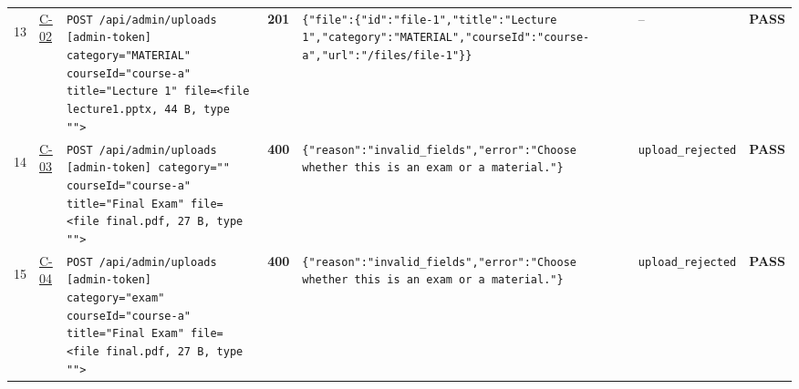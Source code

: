 \documentclass[10pt,a4paper]{article}
\begin{document}
\begin{landscape}
\begin{longtable}{@{}P{0.6cm}P{0.9cm}P{8.5cm}P{1.0cm}P{6.2cm}P{4.2cm}P{1.1cm}@{}}
\hypertarget{call13}{13} & \hyperlink{test-C-02}{C-02} & \texttt{POST /\allowbreak{}api/\allowbreak{}admin/\allowbreak{}uploads [admin-\allowbreak{}token] category=\allowbreak{}"\allowbreak{}MATERIAL"\allowbreak{} courseId=\allowbreak{}"\allowbreak{}course-\allowbreak{}a"\allowbreak{} title=\allowbreak{}"\allowbreak{}Lecture 1"\allowbreak{} file=\allowbreak{}<file lecture1.\allowbreak{}pptx,\allowbreak{} 44 B,\allowbreak{} type "\allowbreak{}"\allowbreak{}>} & \textcolor{passgreen}{\textbf{201}} & \texttt{\{"\allowbreak{}file"\allowbreak{}:\allowbreak{}\{"\allowbreak{}id"\allowbreak{}:\allowbreak{}"\allowbreak{}file-\allowbreak{}1"\allowbreak{},\allowbreak{}"\allowbreak{}title"\allowbreak{}:\allowbreak{}"\allowbreak{}Lecture 1"\allowbreak{},\allowbreak{}"\allowbreak{}category"\allowbreak{}:\allowbreak{}"\allowbreak{}MATERIAL"\allowbreak{},\allowbreak{}"\allowbreak{}courseId"\allowbreak{}:\allowbreak{}"\allowbreak{}course-\allowbreak{}a"\allowbreak{},\allowbreak{}"\allowbreak{}url"\allowbreak{}:\allowbreak{}"\allowbreak{}/\allowbreak{}files/\allowbreak{}file-\allowbreak{}1"\allowbreak{}\}\}} & -- & \textcolor{passgreen}{\textbf{PASS}} \\
\hypertarget{call14}{14} & \hyperlink{test-C-03}{C-03} & \texttt{POST /\allowbreak{}api/\allowbreak{}admin/\allowbreak{}uploads [admin-\allowbreak{}token] category=\allowbreak{}"\allowbreak{}"\allowbreak{} courseId=\allowbreak{}"\allowbreak{}course-\allowbreak{}a"\allowbreak{} title=\allowbreak{}"\allowbreak{}Final Exam"\allowbreak{} file=\allowbreak{}<file final.\allowbreak{}pdf,\allowbreak{} 27 B,\allowbreak{} type "\allowbreak{}"\allowbreak{}>} & \textcolor{warnamber}{\textbf{400}} & \texttt{\{"\allowbreak{}reason"\allowbreak{}:\allowbreak{}"\allowbreak{}invalid\_\allowbreak{}fields"\allowbreak{},\allowbreak{}"\allowbreak{}error"\allowbreak{}:\allowbreak{}"\allowbreak{}Choose whether this is an exam or a material.\allowbreak{}"\allowbreak{}\}} & \texttt{upload\_\allowbreak{}rejected} & \textcolor{passgreen}{\textbf{PASS}} \\
\hypertarget{call15}{15} & \hyperlink{test-C-04}{C-04} & \texttt{POST /\allowbreak{}api/\allowbreak{}admin/\allowbreak{}uploads [admin-\allowbreak{}token] category=\allowbreak{}"\allowbreak{}exam"\allowbreak{} courseId=\allowbreak{}"\allowbreak{}course-\allowbreak{}a"\allowbreak{} title=\allowbreak{}"\allowbreak{}Final Exam"\allowbreak{} file=\allowbreak{}<file final.\allowbreak{}pdf,\allowbreak{} 27 B,\allowbreak{} type "\allowbreak{}"\allowbreak{}>} & \textcolor{warnamber}{\textbf{400}} & \texttt{\{"\allowbreak{}reason"\allowbreak{}:\allowbreak{}"\allowbreak{}invalid\_\allowbreak{}fields"\allowbreak{},\allowbreak{}"\allowbreak{}error"\allowbreak{}:\allowbreak{}"\allowbreak{}Choose whether this is an exam or a material.\allowbreak{}"\allowbreak{}\}} & \texttt{upload\_\allowbreak{}rejected} & \textcolor{passgreen}{\textbf{PASS}} \\

\end{longtable}
\end{landscape}
\end{document}
